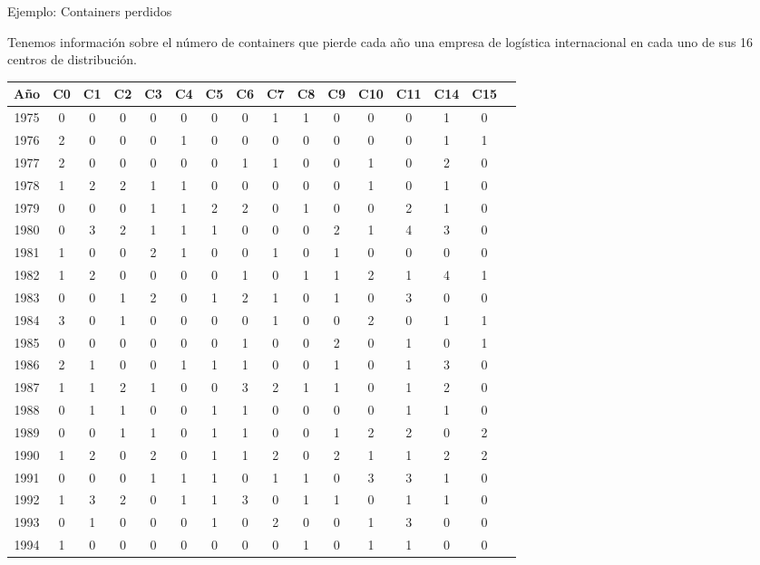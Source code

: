 \documentclass{beamer}
\theoremstyle{definition}
\renewcommand{\arraystretch}{1.5}
\begin{document}
\begin{frame}{\color{rosee}Ejemplo: Containers perdidos}

 \small{Tenemos información sobre el número de containers que pierde cada año una empresa de logística internacional en cada uno de sus 16 centros de distribución.}

  \tiny
  \renewcommand{\arraystretch}{1.2}
  \begin{table}
    \centering
    \begin{tabular}{cccccccccccccccc}
      A\~no&C0&C1&C2&C3&C4&C5&C6&C7&C8&C9&C10&C11&C14&C15\\
      \hline
      1975&0&0&0&0&0&0&0&1&1&0&0&0&1&0\\
      1976&2&0&0&0&1&0&0&0&0&0&0&0&1&1\\
      1977&2&0&0&0&0&0&1&1&0&0&1&0&2&0\\
      1978&1&2&2&1&1&0&0&0&0&0&1&0&1&0\\
      1979&0&0&0&1&1&2&2&0&1&0&0&2&1&0\\
      1980&0&3&2&1&1&1&0&0&0&2&1&4&3&0\\
      1981&1&0&0&2&1&0&0&1&0&1&0&0&0&0\\
      1982&1&2&0&0&0&0&1&0&1&1&2&1&4&1\\
      1983&0&0&1&2&0&1&2&1&0&1&0&3&0&0\\
      1984&3&0&1&0&0&0&0&1&0&0&2&0&1&1\\
      1985&0&0&0&0&0&0&1&0&0&2&0&1&0&1\\
      1986&2&1&0&0&1&1&1&0&0&1&0&1&3&0\\
      1987&1&1&2&1&0&0&3&2&1&1&0&1&2&0\\
      1988&0&1&1&0&0&1&1&0&0&0&0&1&1&0\\
      1989&0&0&1&1&0&1&1&0&0&1&2&2&0&2\\
      1990&1&2&0&2&0&1&1&2&0&2&1&1&2&2\\
      1991&0&0&0&1&1&1&0&1&1&0&3&3&1&0\\
      1992&1&3&2&0&1&1&3&0&1&1&0&1&1&0\\
      1993&0&1&0&0&0&1&0&2&0&0&1&3&0&0\\
      1994&1&0&0&0&0&0&0&0&1&0&1&1&0&0
    \end{tabular}
  \end{table}
\end{frame}
\end{document}
